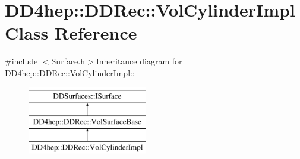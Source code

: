 \hypertarget{class_d_d4hep_1_1_d_d_rec_1_1_vol_cylinder_impl}{
\section{DD4hep::DDRec::VolCylinderImpl Class Reference}
\label{class_d_d4hep_1_1_d_d_rec_1_1_vol_cylinder_impl}
}


{\ttfamily \#include $<$Surface.h$>$}Inheritance diagram for DD4hep::DDRec::VolCylinderImpl::\begin{figure}[H]
\begin{center}
\leavevmode
\includegraphics[height=3cm]{class_d_d4hep_1_1_d_d_rec_1_1_vol_cylinder_impl}
\end{center}
\end{figure}
